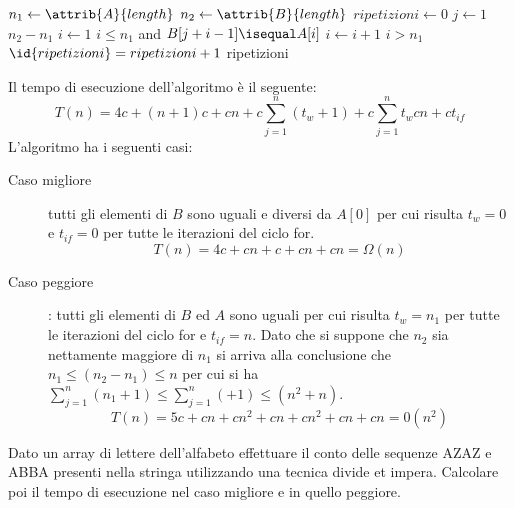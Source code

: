 \begin{codebox}
\li $n_1 \gets \attrib{A}{length}$
\li $n_2 \gets \attrib{B}{length}$
\li $ripetizioni \gets 0$
\li \For $j \gets 1$ \To $n_2 - n_1$
    \Do
\li                $i \gets 1$
\li                \While $i \leq n_1$ and $B[j+i-1] \isequal A[i]$
                   \Do
\li                               $i \gets i + 1$
                   \End
\li                \If $i > n_1$
                   \Then
\li                               $\id{ripetizioni} = ripetizioni + 1$
    \End
\li \Return ripetizioni
\end{codebox}
Il tempo di esecuzione dell'algoritmo è il seguente:
\begin{equation*}
  T(n) = 4c + (n+1)c + cn + c\sum _{j = 1} ^ n (t_{w} + 1) + c\sum _{j = 1} ^ n t_w
         cn + ct_{if}
\end{equation*}
L'algoritmo ha i seguenti casi:
\begin{description}
  \item[Caso migliore] tutti gli elementi di $B$ sono uguali e diversi da $A[0]$
        per cui risulta $t_w = 0$ e $t_{if} = 0$ per tutte le iterazioni del ciclo for.
        \begin{equation*}
          T(n) = 4c + cn + c + cn + cn = \Omega(n)
        \end{equation*}
  \item[Caso peggiore]: tutti gli elementi di $B$ ed $A$ sono uguali per cui risulta
         $t_w = n_1$ per tutte le iterazioni del ciclo for e $t_{if} = n$.
         Dato che si suppone che $n_2$ sia nettamente maggiore di $n_1$ si arriva
         alla conclusione che $n_1 \leq (n_2-n_1) \leq n$ per cui si ha $\sum _{j = 1} ^ n (n_1 + 1)
         \leq \sum _{j = 1} ^ n ( + 1) \leq (n^2 + n)$.
         \begin{equation*}
           T(n) = 5c + cn + cn^2 + cn + cn^2 + cn + cn = 0(n^2)
         \end{equation*}
\end{description}


Dato un array di lettere dell'alfabeto effettuare il conto delle sequenze AZAZ e ABBA
presenti nella stringa utilizzando una tecnica divide et impera.\newline
Calcolare poi il tempo di esecuzione nel caso migliore e in quello peggiore.
